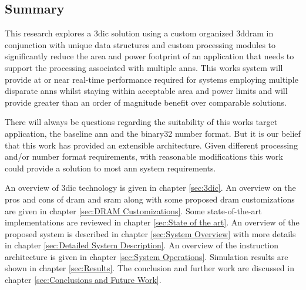 \subsection[Summary]{Summary}
\label{sec:Summary}

This research explores a \ac{3dic} solution using a custom organized \ac{3ddram} in conjunction with unique data structures and custom processing modules to significantly reduce the 
area and power footprint of an application that needs to support the processing associated with multiple \ac{ann}s.
This works system will provide at or near real-time performance required for systems employing multiple disparate \ac{ann}s whilst staying within acceptable area and power limits and will provide greater than an order of magnitude benefit over comparable solutions.

There will always be questions regarding the suitability of this works target application, the baseline \ac{ann} and the \ac{binary32} number format.
But it is our belief that this work has provided an extensible architecture.
Given different processing and/or number format requirements, with reasonable modifications this work could provide a solution to most \ac{ann} system requirements.

An overview of \ac{3dic} technology is given in chapter \ref{sec:3dic}.
An overview on the pros and cons of \ac{dram} and \ac{sram} along with some proposed \ac{dram} customizations are given in chapter \ref{sec:DRAM Customizations}.
Some state-of-the-art implementations are reviewed in chapter \ref{sec:State of the art}.
An overview of the proposed system is described in chapter \ref{sec:System Overview} with more details in chapter \ref{sec:Detailed System Description}.
An overview of the instruction architecture is given in chapter \ref{sec:System Operations}.
Simulation results are shown in chapter \ref{sec:Results}.
The conclusion and further work are discussed in chapter \ref{sec:Conclusions and Future Work}.

